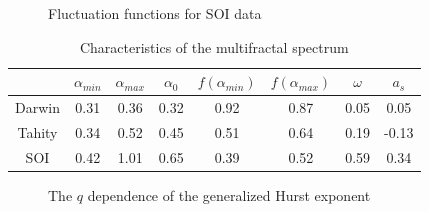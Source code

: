 \documentclass[onecolumn, preprint,aps,amsmath, amssymb, superscriptaddress]{revtex4}
\begin{document}
\begin{figure}
\caption{Fluctuation functions for SOI data}
\label{fig:mfdfa_soi}
\end{figure}






\begin{table}[t]
\begin{center}
\begin{tabular}{ c  c  c  c  c  c  c  c }
\hline

   & $\alpha_{min}$  & $\alpha_{max}$ & $\alpha_0$ & $f(\alpha_{min})$ & $f(\alpha_{max})$ & $\omega$& $a_s$ \\ \hline
Darwin   & 0.31  & 0.36  & 0.32  & 0.92 &  0.87 &  0.05 &  0.05 \\
Tahity     & 0.34  & 0.52  & 0.45  & 0.51 &  0.64 &  0.19 &  -0.13 \\
SOI     & 0.42  & 1.01  & 0.65  & 0.39 &  0.52 &  0.59 &  0.34 \\
\hline
\end{tabular}
\caption{Characteristics of the multifractal spectrum}
\label{tab:mfdfa}
\end{center}
\end{table}


\begin{figure}
\caption{The $q$ dependence of the generalized Hurst exponent}
\label{fig:H}
\end{figure}
\end{document}
